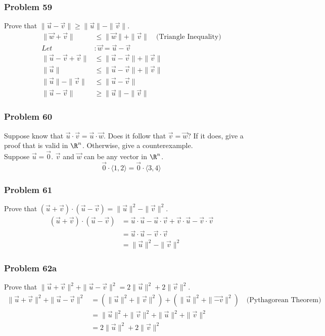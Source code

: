 \documentclass[letterpaper, 12pt]{math}
\begin{document}
\subsubsection*{Problem 59}
Prove that \( \|\vec{u}-\vec{v}\| \ge \|\vec{u}\|-\|\vec{v}\| \).
\begin{align*}
  \|\vec{w}+\vec{v}\| &\le \|\vec{w}\|+\|\vec{v}\|
    \quad\text{(Triangle Inequality)} \\
  Let&: \vec{w} = \vec{u}-\vec{v} \\
  \|\vec{u}-\vec{v}+\vec{v}\| &\le \|\vec{u}-\vec{v}\|+\|\vec{v}\| \\
  \|\vec{u}\| &\le \|\vec{u}-\vec{v}\|+\|\vec{v}\| \\
  \|\vec{u}\|-\|\vec{v}\| &\le \|\vec{u}-\vec{v}\| \\
  \|\vec{u}-\vec{v}\| &\ge \|\vec{u}\|-\|\vec{v}\|
\end{align*}

\subsubsection*{Problem 60}
Suppose know that \( \vec{u}\cdot\vec{v} = \vec{u}\cdot\vec{w} \). Does it
follow that \( \vec{v} = \vec{w} \)? If it does, give a proof that is valid
in \( \R^n \). Otherwise, give a counterexample. \\
Suppose \( \vec{u} = \vec{0} \). \( \vec{v} \) and \( \vec{w} \) can be any
vector in \( \R^n \).
\[ \vec{0}\cdot\langle1,2\rangle = \vec{0}\cdot\langle3,4\rangle \]

\subsubsection*{Problem 61}
Prove that \( (\vec{u}+\vec{v})\cdot(\vec{u}-\vec{v}) =
\|\vec{u}\|^2-\|\vec{v}\|^2 \).
\begin{align*}
  (\vec{u}+\vec{v})\cdot(\vec{u}-\vec{v}) &= \vec{u}\cdot\vec{u}-
    \vec{u}\cdot\vec{v}+\vec{v}\cdot\vec{u}-\vec{v}\cdot\vec{v} \\
  &= \vec{u}\cdot\vec{u}-\vec{v}\cdot\vec{v} \\
  &= \|\vec{u}\|^2-\|\vec{v}\|^2
\end{align*}

\subsubsection*{Problem 62a}
Prove that \( \|\vec{u}+\vec{v}\|^2+\|\vec{u}-\vec{v}\|^2 = 2\|\vec{u}\|^2+
2\|\vec{v}\|^2 \).
\begin{align*}
  \|\vec{u}+\vec{v}\|^2+\|\vec{u}-\vec{v}\|^2 &=
    (\|\vec{u}\|^2+\|\vec{v}\|^2)+(\|\vec{u}\|^2+\|\vec{-v}\|^2)
    \quad\text{(Pythagorean Theorem)} \\
  &= \|\vec{u}\|^2+\|\vec{v}\|^2+\|\vec{u}\|^2+\|\vec{v}\|^2 \\
  &= 2\|\vec{u}\|^2+2\|\vec{v}\|^2
\end{align*}
\end{document}

